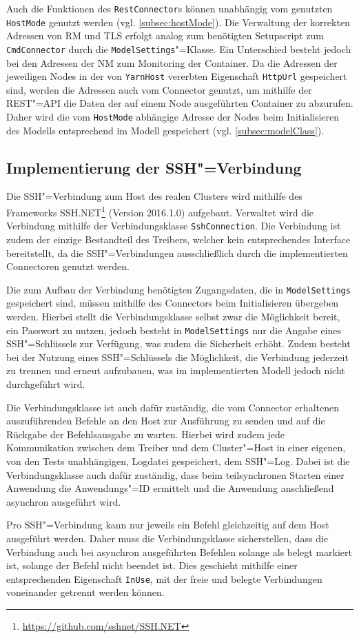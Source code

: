 Auch die Funktionen des \texttt{RestConnector}s können unabhängig vom genutzten \texttt{HostMode} genutzt werden (vgl. \cref{subsec:hostMode}).
Die Verwaltung der korrekten Adressen von \ac{RM} und \ac{TLS} erfolgt analog zum benötigten Setupscript zum \texttt{CmdConnector} durch die \texttt{ModelSettings}"=Klasse.
Ein Unterschied besteht jedoch bei den Adressen der \ac{NM} zum Monitoring der Container.
Da die Adressen der jeweiligen Nodes in der von \texttt{YarnHost} vererbten Eigenschaft \texttt{HttpUrl} gespeichert sind, werden die Adressen auch vom Connector genutzt, um mithilfe der REST"=API die Daten der auf einem Node ausgeführten Container zu abzurufen.
Daher wird die vom \texttt{HostMode} abhängige Adresse der Nodes beim Initialisieren des Modells entsprechend im Modell gespeichert (vgl. \cref{subsec:modelClass}).

\subsection{Implementierung der SSH"=Verbindung}
\label{subsec:sshConnection}

Die SSH"=Verbindung zum Host des realen Clusters wird mithilfe des Frameworks SSH.NET\footnote{\url{https://github.com/sshnet/SSH.NET}} (Version 2016.1.0) aufgebaut.
Verwaltet wird die Verbindung mithilfe der Verbindungsklasse \texttt{SshConnection}.
Die Verbindung ist zudem der einzige Bestandteil des Treibers, welcher kein entsprechendes Interface bereitstellt, da die SSH"=Verbindungen ausschließlich durch die implementierten Connectoren genutzt werden.

Die zum Aufbau der Verbindung benötigten Zugangsdaten, die in \texttt{ModelSettings} gespeichert sind, müssen mithilfe des Connectors beim Initialisieren übergeben werden.
Hierbei stellt die Verbindungsklasse selbst zwar die Möglichkeit bereit, ein Passwort zu nutzen, jedoch besteht in \texttt{ModelSettings} nur die Angabe eines SSH"=Schlüssels zur Verfügung, was zudem die Sicherheit erhöht.
Zudem besteht bei der Nutzung eines SSH"=Schlüssels die Möglichkeit, die Verbindung jederzeit zu trennen und erneut aufzubauen, was im implementierten Modell jedoch nicht durchgeführt wird.

Die Verbindungsklasse ist auch dafür zuständig, die vom Connector erhaltenen auszuführenden Befehle an den Host zur Ausführung zu senden und auf die Rückgabe der Befehlsausgabe zu warten.
Hierbei wird zudem jede Kommunikation zwischen dem Treiber und dem Cluster"=Host in einer eigenen, von den Tests unabhängigen, Logdatei gespeichert, dem SSH"=Log.
Dabei ist die Verbindungsklasse auch dafür zuständig, dass beim teilsynchronen Starten einer Anwendung die Anwendungs"=ID ermittelt und die Anwendung anschließend asynchron ausgeführt wird.

Pro SSH"=Verbindung kann nur jeweils ein Befehl gleichzeitig auf dem Host ausgeführt werden.
Daher muss die Verbindungsklasse sicherstellen, dass die Verbindung auch bei asynchron ausgeführten Befehlen solange als belegt markiert ist, solange der Befehl nicht beendet ist.
Dies geschieht mithilfe einer entsprechenden Eigenschaft \texttt{InUse}, mit der freie und belegte Verbindungen voneinander getrennt werden können.
